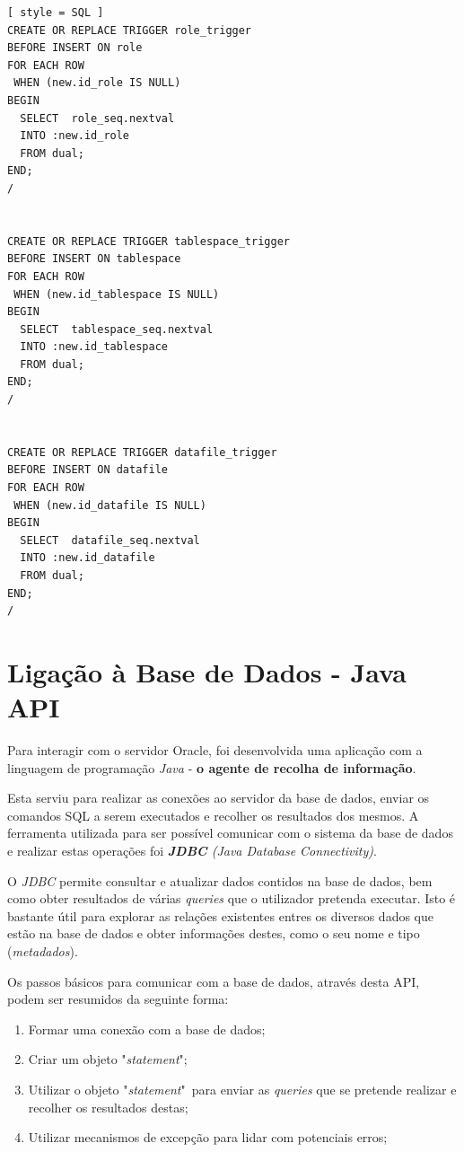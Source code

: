 \documentclass[a4paper]{article}
\begin{document}
\begin{lstlisting}[ style = SQL ]
CREATE OR REPLACE TRIGGER role_trigger
BEFORE INSERT ON role
FOR EACH ROW
 WHEN (new.id_role IS NULL) 
BEGIN
  SELECT  role_seq.nextval
  INTO :new.id_role
  FROM dual;
END;
/  
        

CREATE OR REPLACE TRIGGER tablespace_trigger
BEFORE INSERT ON tablespace
FOR EACH ROW
 WHEN (new.id_tablespace IS NULL) 
BEGIN
  SELECT  tablespace_seq.nextval
  INTO :new.id_tablespace
  FROM dual;
END;
/  
        

CREATE OR REPLACE TRIGGER datafile_trigger
BEFORE INSERT ON datafile
FOR EACH ROW
 WHEN (new.id_datafile IS NULL) 
BEGIN
  SELECT  datafile_seq.nextval
  INTO :new.id_datafile
  FROM dual;
END;
/         

\end{lstlisting}

\section{Ligação à Base de Dados - Java API}
\label{ligacaoBD}
\hspace{3mm} 

Para interagir com o servidor Oracle, foi desenvolvida uma aplicação com a linguagem de programação \emph{Java} - \textbf{o agente de recolha de informação}.

Esta serviu para realizar as conexões ao servidor da base de dados, enviar os comandos SQL a serem executados e recolher os resultados dos mesmos. A ferramenta utilizada para ser possível comunicar com o sistema da base de dados e realizar estas operações foi \emph{\textbf{JDBC} (Java Database Connectivity)}.

O \emph{JDBC} permite consultar e atualizar dados contidos na base de dados, bem como obter resultados de várias \emph{queries} que o utilizador pretenda executar. Isto é bastante útil para explorar as relações existentes entres os diversos dados que estão na base de dados e obter informações destes, como o seu nome e tipo (\emph{metadados}).

Os passos básicos para comunicar com a base de dados, através desta API, podem ser resumidos da seguinte forma:

\begin{enumerate}
    \item Formar uma conexão com a base de dados;
    
    \item Criar um objeto "\emph{statement}";
    
    \item Utilizar o objeto "\emph{statement}"\ para enviar as \emph{queries} que se pretende realizar e recolher os resultados destas;
    
    \item Utilizar mecanismos de excepção para lidar com potenciais erros;
\end{enumerate}
\end{document}
